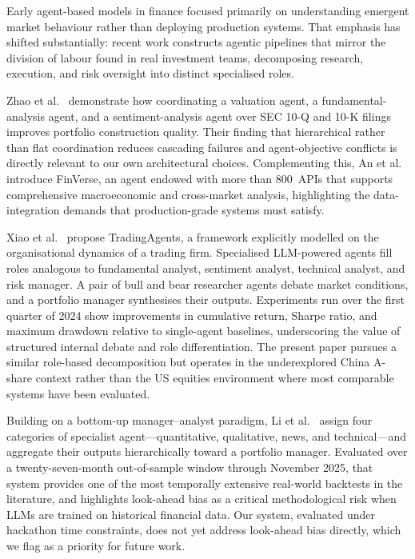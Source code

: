 \documentclass[11pt,a4paper]{article}
\begin{document}
Early agent-based models in finance focused primarily on understanding
emergent market behaviour rather than deploying production systems. That
emphasis has shifted substantially: recent work constructs agentic
pipelines that mirror the division of labour found in real investment
teams, decomposing research, execution, and risk oversight into distinct
specialised roles.

Zhao et al.\ \cite{zhao2025alphaagents} demonstrate how coordinating a
valuation agent, a fundamental-analysis agent, and a sentiment-analysis
agent over SEC 10-Q and 10-K filings improves portfolio construction
quality. Their finding that hierarchical rather than flat coordination
reduces cascading failures and agent-objective conflicts is directly
relevant to our own architectural choices. Complementing this,
An et al.\ \cite{an2024finverse} introduce FinVerse, an agent endowed
with more than 800~APIs that supports comprehensive macroeconomic and
cross-market analysis, highlighting the data-integration demands that
production-grade systems must satisfy.

Xiao et al.\ \cite{xiao2025tradingagents} propose TradingAgents, a
framework explicitly modelled on the organisational dynamics of a
trading firm. Specialised LLM-powered agents fill roles analogous to
fundamental analyst, sentiment analyst, technical analyst, and risk
manager. A pair of bull and bear researcher agents debate market
conditions, and a portfolio manager synthesises their outputs.
Experiments run over the first quarter of 2024 show improvements in
cumulative return, Sharpe ratio, and maximum drawdown relative to
single-agent baselines, underscoring the value of structured internal
debate and role differentiation. The present paper pursues a similar
role-based decomposition but operates in the underexplored China A-share
context rather than the US equities environment where most comparable
systems have been evaluated.

Building on a bottom-up manager--analyst paradigm, Li et
al.\ \cite{li2026expertteam} assign four categories of specialist
agent---quantitative, qualitative, news, and technical---and aggregate
their outputs hierarchically toward a portfolio manager. Evaluated over
a twenty-seven-month out-of-sample window through November 2025, that
system provides one of the most temporally extensive real-world
backtests in the literature, and highlights look-ahead bias as a
critical methodological risk when LLMs are trained on historical
financial data. Our system, evaluated under hackathon time constraints,
does not yet address look-ahead bias directly, which we flag as a
priority for future work.
\end{document}
